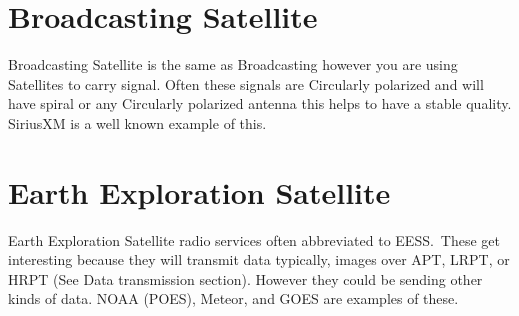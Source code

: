 \documentclass{book}
\begin{document}
    \section{Broadcasting Satellite}
        Broadcasting Satellite is the same as Broadcasting however you are using Satellites to carry signal. Often these signals are Circularly polarized and will have spiral or any Circularly polarized antenna
        this helps to have a stable quality. SiriusXM is a well known example of this.
    \section{Earth Exploration Satellite}
        Earth Exploration Satellite radio services often abbreviated to EESS.\ 
        These get interesting because they will transmit data typically,
        images over APT, LRPT, or HRPT (See Data transmission section). 
        However they could be sending other kinds of data.
        NOAA (POES), Meteor, and GOES are examples of these.
    \section{}
\end{document}
